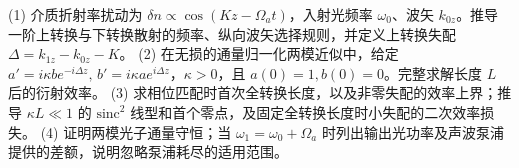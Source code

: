 (1) 介质折射率扰动为 \(\delta n\propto\cos(Kz-\Omega_at)\)，入射光频率 \(\omega_0\)、波矢 \(k_{0z}\)。推导一阶上转换与下转换散射的频率、纵向波矢选择规则，并定义上转换失配 \(\Delta=k_{1z}-k_{0z}-K\)。
(2) 在无损的通量归一化两模近似中，给定 \(a'=i\kappa b e^{-i\Delta z},\,b'=i\kappa a e^{i\Delta z}\)，\(\kappa>0\)，且 \(a(0)=1,b(0)=0\)。完整求解长度 \(L\) 后的衍射效率。
(3) 求相位匹配时首次全转换长度，以及非零失配的效率上界；推导 \(\kappa L\ll1\) 的 \(\mathrm{sinc}^2\) 线型和首个零点，及固定全转换长度时小失配的二次效率损失。
(4) 证明两模光子通量守恒；当 \(\omega_1=\omega_0+\Omega_a\) 时列出输出光功率及声波泵浦提供的差额，说明忽略泵浦耗尽的适用范围。

